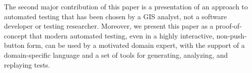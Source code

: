 The second major contribution of this paper is a presentation of an
approach to automated testing that has been chosen by a GIS analyst, not a
software developer or testing researcher.  Moreover, we present this
paper as a proof-of-concept that modern automated testing, even in a
highly interactive, non-push-button form, can be used by a motivated
domain expert, with the support of  a domain-specific language and a
set of tools for generating, analyzing, and replaying tests.


